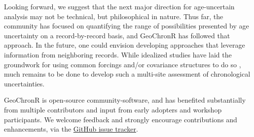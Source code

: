 \documentclass[gchron, manuscript]{copernicus}
\begin{document}
Looking forward, we suggest that the next major direction for age-uncertain analysis may not be technical, but philosophical in nature. Thus far, the community has focused on quantifying the range of possibilities presented by age uncertainty on a record-by-record basis, and GeoChronR has followed that approach. In the future, one could envision developing approaches that leverage information from neighboring records. While idealized studies have laid the groundwork for using common forcings and/or covariance structures to do so \citep{wernerTingley2015}, much remains to be done to develop such a multi-site assessment of chronological uncertainties.

GeoChronR is open-source community-software, and has benefited substantially from multiple contributors and input from early adopters and workshop participants.
We welcome feedback and strongly encourage contributions and enhancements, via the \href{https://github.com/nickmckay/GeoChronR/issues}{GitHub issue tracker}.











\end{document}
